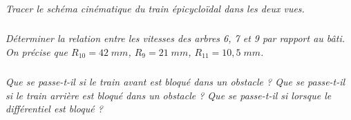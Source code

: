 \documentclass[10pt]{article}
\begin{document}
\subparagraph{}
\textit{Tracer le schéma cinématique du train épicycloïdal dans les deux vues.}
%
%
%
%
%
%
\subparagraph{}
\textit{Déterminer la relation entre les vitesses des arbres 6, 7 et 9 par rapport au bâti. On précise que  $R_{10}=42\;mm$, $R_{9}=21\;mm$, $R_{11}=10,5 \;mm$.}



\subparagraph{}
\textit{Que se passe-t-il si le train avant est bloqué dans un obstacle ? Que se passe-t-il si le train arrière est bloqué dans un obstacle ? Que se passe-t-il si lorsque le différentiel est bloqué ?}
\end{document}
